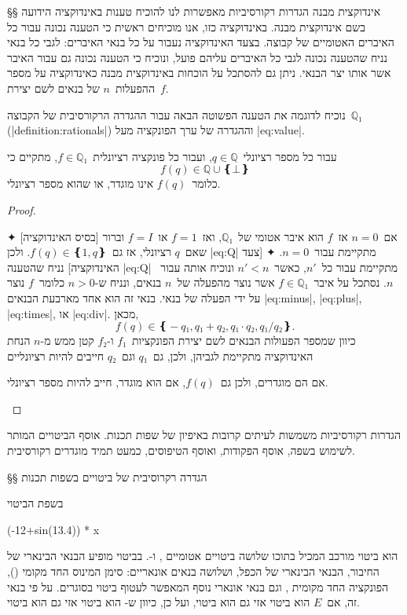 §§ אינדוקצית מבנה
הגדרות רקורסיביות מאפשרות לנו להוכיח טענות באינדוקציה הידועה בשם אינדוקצית
מבנה. באינדוקציה כזו, אנו מוכיחים ראשית כי הטענה נכונה עבור כל האיברים האטומיים
של קבוצה. בצעד האינדוקציה נעבור על כל בנאי האיברים: לגבי כל בנאי נניח שהטענה
נכונה לגבי כל האיברים עליהם פועל, ונוכיח כי הטענה נכונה גם עבור האיבר אשר אותו
יצר הבנאי. ניתן גם להסתכל על הוכחות באינדוקצית מבנה כאינדוקציה על מספר
ההפעלות~$n$ של בנאים לשם יצירת~$f$.

נוכיח לדוגמה את הטענה הפשוטה הבאה עבור ההגדרה הרקורסיבית של הקבוצה~$ℚ₁$
(|definition:rationals|) וההגדרה של ערך הפונקציה מעל |eq:value|.

\begin{claim}
  עבור כל מספר רציונלי~$q∈ℚ$, ועבור כל פונקציה רציונלית~$f∈ℚ₁$, מתקיים כי
  \begin{equation}\label{eq:Q}
    f(q)∈ℚ∪❴⊥❵
  \end{equation}
  כלומר~$f(q)$ אינו מוגדר, או שהוא מספר רציונלי.
\end{claim}

\begin{proof}
  \mbox{}
  \begin{description}
    ✦ [בסיס האינדוקציה] אם~$n=0$ אז~$f$ הוא איבר אטומי של~$ℚ₁$,
    ואז~$f=1$ או~$f=I$ וברור שאם~$q$ רציונלי, אז גם~$f(q)∈❴1,q❵$. ולכן
    |eq:Q| מתקיימת עבור~$n=0$.
    ✦ [צעד האינדוקציה] נניח שהטענה |eq:Q| מתקיימת עבור כל~$n'$, כאשר~$n'<n$
    ונוכיח אותה עבור~$n$.
    נסתכל על איבר~$f∈ℚ₁$ אשר נוצר מהפעלה של~$n$ בנאים, ונניח ש-$n>0$ כלומר~$f$
    נוצר על ידי הפעלה של בנאי. בנאי זה הוא אחד מארבעת הבנאים |eq:minus|,
    |eq:plus|, |eq:times|, או |eq:div|.
    מכאן, \[
      f(q)∈❴-q₁,q₁+q₂,q₁·q₂,q₁/q₂❵.
\] כיוון שמספר הפעולות הבנאים לשם יצירת הפונקציות~$f₁$ ו-$f₂$ קטן ממש מ-$n$
    הנחת האינדוקציה מתקיימת לגביהן, ולכן, גם~$q₁$ וגם~$q₂$ חייבים להיות רציונליים

    אם הם מוגדרים, ולכן גם~$f(q)$,
    אם הוא מוגדר, חייב
    להיות מספר רציונלי.
  \end{description}
\end{proof}

הגדרות רקורסיביות משמשות לעיתים קרובות באיפיון של שפות תכנות. אוסף הביטויים
המותר לשימוש בשפה, אוסף הפקודות, ואוסף הטיפוסים, כמעט תמיד מוגדרים רקורסיבית.

§§ הגדרה רקרוסיבית של ביטויים בשפות תכנות

בשפת  הביטוי
\begin{PASCAL}
(-12+sin(13.4)) * x
\end{PASCAL}
הוא ביטוי מורכב המכיל בתוכו שלושה ביטויים אטומיים , 
ו-. בביטוי מופיע הבנאי הבינארי של החיבור, הבנאי הבינארי של הכפל,
ושלושה בנאים אונאריים: סימן המינוס החד מקומי (), הפונקציה החד מקומית
, וגם בנאי אונארי נוסף המאפשר לעטוף ביטוי בסוגרים. על פי בנאי
זה, אם~$E$ הוא ביטוי אזי גם  הוא ביטוי, ועל כן, כיוון
ש- הוא ביטוי אזי גם  הוא ביטוי.

